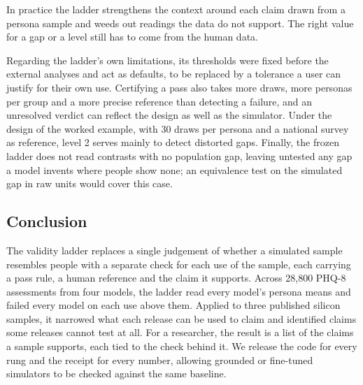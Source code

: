 In practice the ladder strengthens the context around each claim drawn from a persona sample and weeds out readings the data do not support.
The right value for a gap or a level still has to come from the human data.

Regarding the ladder's own limitations, its thresholds were fixed before the external analyses and act as defaults, to be replaced by a tolerance a user can justify for their own use.
Certifying a pass also takes more draws, more personas per group and a more precise reference than detecting a failure, and an unresolved verdict can reflect the design as well as the simulator.
Under the design of the worked example, with 30 draws per persona and a national survey as reference, level 2 serves mainly to detect distorted gaps.
Finally, the frozen ladder does not read contrasts with no population gap, leaving untested any gap a model invents where people show none; an equivalence test on the simulated gap in raw units would cover this case.

\subsection*{Conclusion}

The validity ladder replaces a single judgement of whether a simulated sample resembles people with a separate check for each use of the sample, each carrying a pass rule, a human reference and the claim it supports.
Across 28,800 PHQ-8 assessments from four models, the ladder read every model's persona means and failed every model on each use above them. %
Applied to three published silicon samples, it narrowed what each release can be used to claim and identified claims some releases cannot test at all.
For a researcher, the result is a list of the claims a sample supports, each tied to the check behind it.
We release the code for every rung and the receipt for every number, allowing grounded or fine-tuned simulators to be checked against the same baseline.
